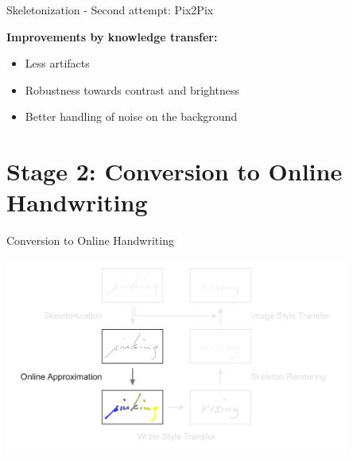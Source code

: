 \documentclass[aspectratio=169]{beamer}
\begin{document}
\begin{frame}{Skeletonization - Second attempt: Pix2Pix}
\vspace{-1em}
\begin{figure}[H]
\end{figure}
\vspace{1em}
\textbf{Improvements by knowledge transfer:}
\begin{itemize}
\item Less artifacts
\item Robustness towards contrast and brightness
\item Better handling of noise on the background
\end{itemize}
\end{frame}



\section{Stage 2: Conversion to Online Handwriting}
\begin{frame}{Conversion to Online Handwriting}
\begin{center}
\vspace{-1em}
\includegraphics[width=0.85\textwidth]{assets/pipeline/pipeline_conversion.pdf}
\end{center}
\end{frame}
\end{document}
